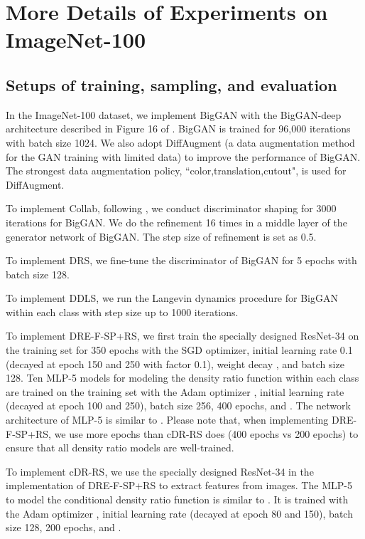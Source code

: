 \documentclass[final,12pt, 3p,times]{elsarticle}
\begin{document}
\section{More Details of Experiments on ImageNet-100}\label{supp:details_of_imagenet100}

\subsection{Setups of training, sampling, and evaluation}

In the ImageNet-100 dataset, we implement BigGAN with the BigGAN-deep architecture described in Figure 16 of \cite{brock2018large}. BigGAN is trained for 96,000 iterations with batch size 1024. We also adopt DiffAugment \cite{zhao2020differentiable} (a data augmentation method for the GAN training with limited data) to improve the performance of BigGAN. The strongest data augmentation policy, ``color,translation,cutout", is used for DiffAugment.

To implement Collab, following \cite{liu2020collaborative}, we conduct discriminator shaping for 3000 iterations for BigGAN. We do the refinement 16 times in a middle layer of the generator network of BigGAN. The step size of refinement is set as 0.5. 

To implement DRS, we fine-tune the discriminator of BigGAN for 5 epochs with batch size 128.  

To implement DDLS, we run the Langevin dynamics procedure for BigGAN within each class with step size  up to 1000 iterations.

To implement DRE-F-SP+RS, we first train the specially designed ResNet-34 on the training set for 350 epochs with the SGD optimizer, initial learning rate 0.1 (decayed at epoch 150 and 250 with factor 0.1), weight decay , and batch size 128. Ten MLP-5 models for modeling the density ratio function within each class are trained on the training set with the Adam optimizer \cite{kingma2014adam}, initial learning rate  (decayed at epoch 100 and 250), batch size 256, 400 epochs, and . The network architecture of MLP-5 is similar to . Please note that, when implementing DRE-F-SP+RS, we use more epochs than cDR-RS does (400 epochs vs 200 epochs) to ensure that all density ratio models are well-trained. 

To implement cDR-RS, we use the specially designed ResNet-34 in the implementation of DRE-F-SP+RS to extract features from images. The MLP-5 to model the conditional density ratio function is similar to . It is trained with the Adam optimizer \cite{kingma2014adam}, initial learning rate  (decayed at epoch 80 and 150), batch size 128, 200 epochs, and .
\end{document}
